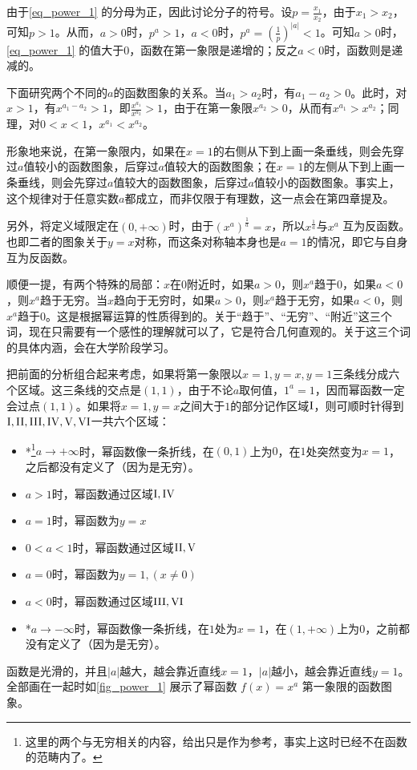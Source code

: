 由于\autoref{eq_power_1} 的分母为正，因此讨论分子的符号。设$\displaystyle p=\frac{x_1}{x_2}$，由于$x_1>x_2$，可知$p>1$。从而，$a>0$时，$p^a>1$，$a<0$时，$\displaystyle p^a=\left(\frac{1}{p}\right)^{|a|}<1$。可知$a>0$时，\autoref{eq_power_1} 的值大于$0$，函数在第一象限是递增的；反之$a<0$时，函数则是递减的。

下面研究两个不同的$a$的函数图象的关系。当$a_1>a_2$时，有$a_1-a_2>0$。此时，对$x>1$，有$x^{a_1-a_2}>1$，即$\displaystyle \frac{x^{a_1}}{x^{a_2}}>1$，由于在第一象限$x^{a_2}>0$，从而有$x^{a_1}>x^{a_2}$；同理，对$0<x<1$，$x^{a_1}<x^{a_2}$。

形象地来说，在第一象限内，如果在$x=1$的右侧从下到上画一条垂线，则会先穿过$a$值较小的函数图象，后穿过$a$值较大的函数图象；在$x=1$的左侧从下到上画一条垂线，则会先穿过$a$值较大的函数图象，后穿过$a$值较小的函数图象。事实上，这个规律对于任意实数$a$都成立，而非仅限于有理数，这一点会在第四章提及。

另外，将定义域限定在$(0,+\infty)$时，由于$\displaystyle(x^a)^{\frac{1}{a}}=x$，所以$\displaystyle x^{\frac{1}{a}}$与$x^a$ 互为反函数。也即二者的图象关于$y=x$对称，而这条对称轴本身也是$a=1$的情况，即它与自身互为反函数。

顺便一提，有两个特殊的局部：$x$在$0$附近时，如果$a>0$，则$x^a$趋于$0$，如果$a<0$，则$x^a$趋于无穷。当$x$趋向于无穷时，如果$a>0$，则$x^a$趋于无穷，如果$a<0$，则$x^a$趋于$0$。这是根据幂运算的性质得到的。关于“趋于”、“无穷”、“附近”这三个词，现在只需要有一个感性的理解就可以了，它是符合几何直观的。关于这三个词的具体内涵，会在大学阶段学习。

把前面的分析组合起来考虑，如果将第一象限以$x=1,y=x,y=1$三条线分成六个区域。这三条线的交点是$(1,1)$，由于不论$a$取何值，$1^a=1$，因而幂函数一定会过点$(1,1)$。如果将$x=1,y=x$之间大于$1$的部分记作区域$\rm{I}$，则可顺时针得到$\rm{I, II, III, IV, V, VI}$一共六个区域：
\begin{itemize}
\item *\footnote{这里的两个与无穷相关的内容，给出只是作为参考，事实上这时已经不在函数的范畴内了。}$a\to+\infty$时，幂函数像一条折线，在$(0,1)$上为$0$，在$1$处突然变为$x=1$，之后都没有定义了（因为是无穷）。
\item $a>1$时，幂函数通过区域$\rm{I,IV}$
\item $a=1$时，幂函数为$y=x$
\item $0<a<1$时，幂函数通过区域$\rm{II,V}$
\item $a=0$时，幂函数为$y=1,(x\neq0)$
\item $a<0$时，幂函数通过区域$\rm{III,VI}$
\item *$a\to-\infty$时，幂函数像一条折线，在$1$处为$x=1$，在$(1,+\infty)$上为$0$，之前都没有定义了（因为是无穷）。
\end{itemize}
函数是光滑的，并且$|a|$越大，越会靠近直线$x=1$，$|a|$越小，越会靠近直线$y=1$。全部画在一起时如\autoref{fig_power_1} 展示了幂函数 $f(x) = x^a$ 第一象限的函数图象。

